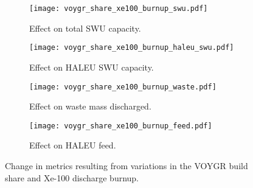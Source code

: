 \begin{figure}
    \ContinuedFloat    
    \begin{subfigure}[t]{0.48\textwidth}
        \centering
        \texttt{[image: voygr\_share\_xe100\_burnup\_swu.pdf]}
        \caption{Effect on total SWU capacity.}
        \label{fig:voygr_share_xe100_burnup_swu}
    \end{subfigure}
    \hfill
    \begin{subfigure}[t]{0.48\textwidth}
        \centering
        \texttt{[image: voygr\_share\_xe100\_burnup\_haleu\_swu.pdf]}
        \caption{Effect on HALEU SWU capacity.}
        \label{fig:voygr_share_xe100_burnup_haleu_swu}
    \end{subfigure}
    
    \begin{subfigure}[t]{0.48\textwidth}
        \centering
        \texttt{[image: voygr\_share\_xe100\_burnup\_waste.pdf]}
        \caption{Effect on waste mass discharged.}
        \label{fig:voygr_share_xe100_burnup_waste}
    \end{subfigure}
    \hfill
    \begin{subfigure}[t]{0.48\textwidth}
        \centering
        \texttt{[image: voygr\_share\_xe100\_burnup\_feed.pdf]}
        \caption{Effect on HALEU feed.}
        \label{fig:voygr_share_xe100_burnup_feed}
    \end{subfigure}
    \caption{Change in metrics resulting from variations in the 
    VOYGR build share and Xe-100 discharge burnup.}
    \label{fig:voygr_share_xe100_burnup}
\end{figure}
